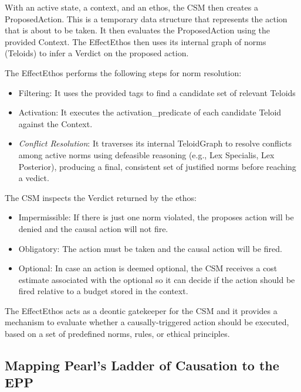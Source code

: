 With an active state, a context, and an ethos, the CSM then creates a ProposedAction. This is a temporary data structure that represents the action that is about to be taken. It then evaluates the ProposedAction using the provided Context. The EffectEthos then uses its internal graph of norms (Teloids) to infer a Verdict on the proposed action.

The EffectEthos performs the following steps for norm resolution:
    \begin{itemize}
        \item Filtering: It uses the provided tags to find a candidate set of relevant Teloids 
        \item Activation: It executes the activation\_predicate of each candidate Teloid against the Context.
        \item \textit{Conflict Resolution}: It traverses its internal TeloidGraph to resolve conflicts among active norms using defeasible reasoning (e.g., Lex Specialis, Lex Posterior), producing a final, consistent set of justified norms before reaching a vedict.
    \end{itemize}

The CSM inspects the Verdict returned by the ethos:
\begin{itemize}
	\item Impermissible: If there is just one norm violated, the proposes action will be denied and the causal action will not fire. 
	\item Obligatory: The action must be taken and the causal action will be fired.
	\item Optional: In case an action is deemed optional, the CSM receives a cost estimate associated with the optional so it can decide if the action should be fired relative to a budget stored in the context.   
\end{itemize}

The EffectEthos acts as a deontic  gatekeeper for the CSM and it provides a mechanism to evaluate whether a causally-triggered action should be executed, based on a set of predefined norms, rules, or ethical principles. 

\newpage

%
%
\subsection{Mapping Pearl's Ladder of Causation to the EPP}
\label{sec:epp_ladder_causation}

